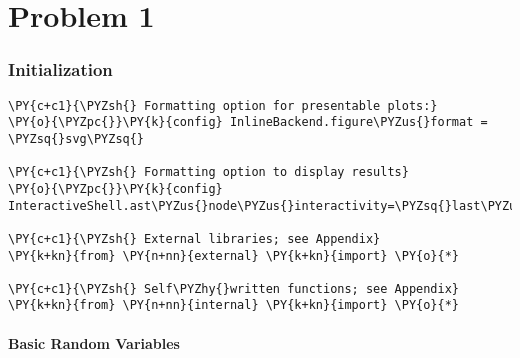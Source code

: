 % 
    
    

    
    \hypertarget{problem-1}{%
\section{Problem 1}\label{problem-1}}

    \hypertarget{initialization}{%
\subsubsection{Initialization}\label{initialization}}

    \begin{tcolorbox}[breakable, size=fbox, boxrule=1pt, pad at break*=1mm,colback=cellbackground, colframe=cellborder]
\begin{Verbatim}[commandchars=\\\{\}]
\PY{c+c1}{\PYZsh{} Formatting option for presentable plots:}
\PY{o}{\PYZpc{}}\PY{k}{config} InlineBackend.figure\PYZus{}format = \PYZsq{}svg\PYZsq{} 

\PY{c+c1}{\PYZsh{} Formatting option to display results}
\PY{o}{\PYZpc{}}\PY{k}{config} InteractiveShell.ast\PYZus{}node\PYZus{}interactivity=\PYZsq{}last\PYZus{}expr\PYZus{}or\PYZus{}assign\PYZsq{}

\PY{c+c1}{\PYZsh{} External libraries; see Appendix}
\PY{k+kn}{from} \PY{n+nn}{external} \PY{k+kn}{import} \PY{o}{*} 

\PY{c+c1}{\PYZsh{} Self\PYZhy{}written functions; see Appendix}
\PY{k+kn}{from} \PY{n+nn}{internal} \PY{k+kn}{import} \PY{o}{*}
\end{Verbatim}
\end{tcolorbox}

    \hypertarget{basic-random-variables}{%
\paragraph{Basic Random Variables}\label{basic-random-variables}}


